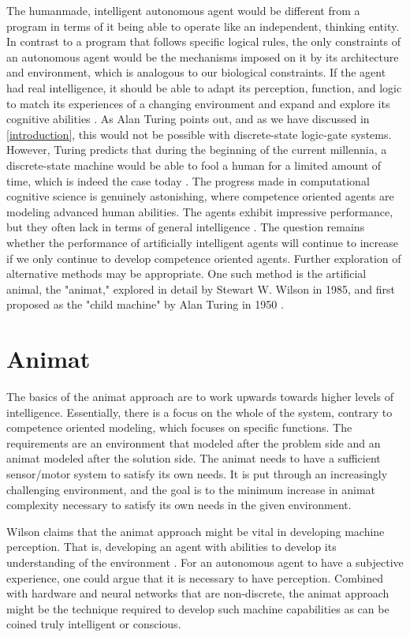 The humanmade, intelligent autonomous agent would be different from a program in terms of it being able to operate like an independent, thinking entity.
In contrast to a program that follows specific logical rules,  the only constraints of an autonomous agent would be the mechanisms imposed on it by its architecture and environment, which is analogous to our biological constraints.
If the agent had real intelligence, it should be able to adapt its perception, function, and logic to match its experiences of a changing environment and expand and explore its cognitive abilities \cite{franklin_is_1997}.
As Alan Turing points out, and as we have discussed in \vref{introduction}, this would not be possible with discrete-state logic-gate systems.
However, Turing predicts that during the beginning of the current millennia, a discrete-state machine would be able to fool a human for a limited amount of time,
which is indeed the case today \cite{turing_computing_2009}.
The progress made in computational cognitive science is genuinely astonishing, where competence oriented agents are modeling advanced human abilities.
The agents exhibit impressive performance, but they often lack in terms of general intelligence \cite{wilson_animat_1991}.
The question remains whether the performance of artificially intelligent agents will continue to increase if we only continue to develop competence oriented agents. Further exploration of alternative methods may be appropriate.
One such method is the artificial animal, the "animat," explored in detail by Stewart W. Wilson in 1985, and first proposed as the "child machine" by Alan Turing in 1950 \cite{wilson_animat_1991} \cite{turing_computing_2009}.

\section{Animat}
The basics of the animat approach are to work upwards towards higher levels of intelligence.
Essentially, there is a focus on the whole of the system, contrary to competence oriented modeling, which focuses on specific functions.
The requirements are an environment that modeled after the problem side and an animat modeled after the solution side.   The animat needs to have a sufficient sensor/motor system to satisfy its own needs. It is put through an increasingly challenging environment, and the goal is to the minimum increase in animat complexity necessary to satisfy its own needs in the given environment.

Wilson claims that the animat approach might be vital in developing machine perception.
That is, developing an agent with abilities to develop its understanding of the environment \cite{wilson_animat_1991}.
For an autonomous agent to have a subjective experience, one could argue that it is necessary to have perception.
Combined with hardware and neural networks that are non-discrete, the animat approach might be the technique required to develop such machine capabilities as can be coined truly intelligent or conscious.




